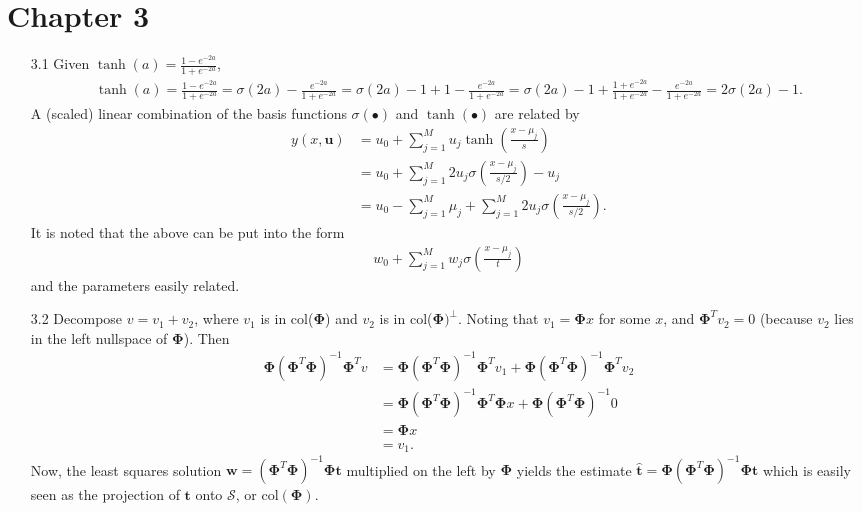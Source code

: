 \documentclass[]{article}
\begin{document}
\section*{Chapter 3}
\begin{enumerate}
	\item[3.1] Given $\tanh(a)=\frac{1 - e^{-2a}}{1 + e^{-2a}}$,
	\begin{align*}
	\tanh(a) = \frac{1 - e^{-2a}}{1 + e^{-2a}} = \sigma(2a) - \frac{e^{-2a}}{1 + e^{-2a}} = \sigma(2a) - 1 + 1 - \frac{e^{-2a}}{1 + e^{-2a}} = \sigma(2a) - 1 + \frac{1 + e^{-2a}}{1 + e^{-2a}} - \frac{e^{-2a}}{1 + e^{-2a}} = 2\sigma(2a) - 1.
	\end{align*}
	A (scaled) linear combination of the basis functions $\sigma(\bullet)$ and $\tanh(\bullet)$ are related by
	\begin{align*}
	y(x, \mathbf{u}) &= u_0 + \sum_{j=1}^{M}u_j \tanh\left( \frac{x - \mu_j}{s} \right) \\
	&= u_0 + \sum_{j=1}^{M} 2 u_j \sigma \left( \frac{x - \mu_j}{s/2} \right) - u_j \\
	&= u_0 - \sum_{j=1}^{M} \mu_j + \sum_{j=1}^M 2u_j\sigma \left( \frac{x - \mu_j}{s/2} \right).
	\end{align*}
	It is noted that the above can be put into the form 
	\begin{align*}
	w_0 + \sum_{j=1}^{M} w_j \sigma \left( \frac{x - \mu_j}{t} \right)
	\end{align*}
	and the parameters easily related.
	\item[3.2] Decompose $v=v_1+v_2$, where $v_1$ is in col($\bm{\Phi}$) and $v_2$ is in col($\bm{\Phi})^\perp$. Noting that $v_1=\bm{\Phi}x$ for some $x$, and $\bm{\Phi}^Tv_2=0$ (because $v_2$ lies in the left nullspace of $\bm{\Phi}$). Then
	\begin{align*}
	\bm{\Phi}(\bm{\Phi}^T\bm{\Phi})^{-1}\bm{\Phi}^Tv &= \bm{\Phi}(\bm{\Phi}^T\bm{\Phi})^{-1}\bm{\Phi}^Tv_1 + \bm{\Phi}(\bm{\Phi}^T\bm{\Phi})^{-1}\bm{\Phi}^Tv_2 \\
	&= \bm{\Phi}(\bm{\Phi}^T\bm{\Phi})^{-1}\bm{\Phi}^T\bm{\Phi}x + \bm{\Phi}(\bm{\Phi}^T\bm{\Phi})^{-1}0 \\
	&= \bm{\Phi}x \\
	&= v_1.
	\end{align*}
	Now, the least squares solution $\mathbf{w}=(\bm{\Phi}^T\bm{\Phi})^{-1}\bm{\Phi}\mathbf{t}$ multiplied on the left by $\bm{\Phi}$ yields the estimate $\hat{\mathbf{t}}=\bm{\Phi}(\bm{\Phi}^T\bm{\Phi})^{-1}\bm{\Phi}\mathbf{t}$ which is easily seen as the projection of $\mathbf{t}$ onto $\mathcal{S}$, or col$(\bm{\Phi})$.

\end{enumerate}
\end{document}
